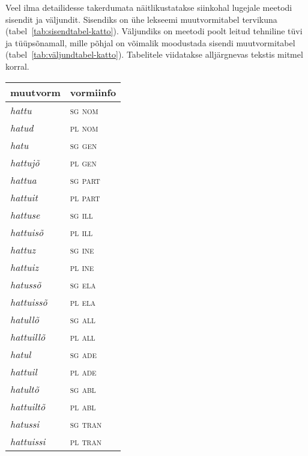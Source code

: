 \documentclass[12pt,a4paper]{article}
\begin{document}
Veel ilma detailidesse takerdumata näitlikustatakse siinkohal lugejale meetodi sisendit ja väljundit. Sisendiks on ühe lekseemi muutvormitabel tervikuna (tabel~\ref{tab:sisendtabel-katto}). Väljundiks on meetodi poolt leitud tehniline tüvi ja tüüp\-sõna\-mall, mille põhjal on võimalik moodustada sisendi muutvormi\-tabel (tabel~\ref{tab:väljundtabel-katto}). Tabelitele viidatakse alljärgnevas tekstis mitmel korral.

\begin{table}[H] %
      \footnotesize
  \begin{minipage}[t]{.40\textwidth}
    \begin{tabular}[t]{l l}
      muutvorm            & vormiinfo \\ \hline
      \textit{hattu}      & \textsc{sg nom} \\
      \textit{hatud}      & \textsc{pl nom} \\
      \textit{hatu}       & \textsc{sg gen} \\
      \textit{hattujõ}    & \textsc{pl gen} \\
      \textit{hattua}     & \textsc{sg part} \\
      \textit{hattuit}    & \textsc{pl part} \\
      \textit{hattuse}    & \textsc{sg ill} \\
      \textit{hattuisõ}   & \textsc{pl ill} \\
      \textit{hattuz}     & \textsc{sg ine} \\
      \textit{hattuiz}    & \textsc{pl ine} \\
      \textit{hatussõ}    & \textsc{sg ela} \\
      \textit{hattuissõ}  & \textsc{pl ela} \\
      \textit{hatullõ}    & \textsc{sg all} \\
      \textit{hattuillõ}  & \textsc{pl all} \\
      \textit{hatul}      & \textsc{sg ade} \\
      \textit{hattuil}    & \textsc{pl ade} \\
      \textit{hatultõ}    & \textsc{sg abl} \\
      \textit{hattuiltõ}  & \textsc{pl abl} \\
      \textit{hatussi}    & \textsc{sg tran} \\
      \textit{hattuissi}  & \textsc{pl tran} \\

\end{tabular}
\end{minipage}
\end{table}
\end{document}

